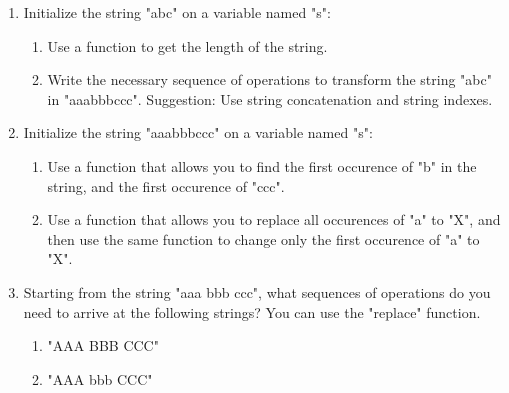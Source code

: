 \begin{enumerate}

\item Initialize the string "abc" on a variable named "s":
\begin{enumerate}
\item Use a function to get the length of the string.
\item Write the necessary sequence of operations to transform the string "abc" in "aaabbbccc". Suggestion: Use string concatenation and string indexes.
\end{enumerate}

\item Initialize the string "aaabbbccc" on a variable named "s":
\begin{enumerate}
\item Use a function that allows you to find the first occurence of "b" in the string, and the first occurence of "ccc".
\item Use a function that allows you to replace all occurences of "a" to "X", and then use the same function to change only the first occurence of "a" to "X".
\end{enumerate}

\item Starting from the string "aaa bbb ccc", what sequences of operations do you need to arrive at the following strings? You can use the "replace" function.
\begin{enumerate}
\item "AAA BBB CCC"
\item "AAA bbb CCC"
\end{enumerate}

\end{enumerate}
